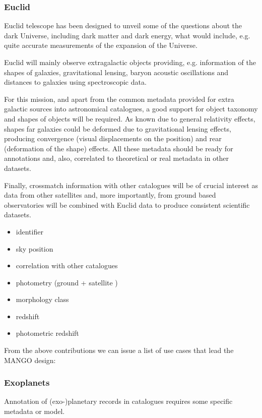 \documentclass[11pt,a4paper]{ivoa}
\begin{document}
\subsubsection{Euclid}
Euclid telescope has been designed to unveil some of the questions about the
dark Universe, including dark matter and dark energy, what would include, e.g.
quite accurate measurements of the expansion of the Universe.

Euclid will mainly observe extragalactic objects providing, e.g. information
of the shapes of galaxies, gravitational lensing,  baryon acoustic oscillations
and distances to galaxies using spectroscopic data.

For this mission, and apart from the common metadata provided for extra galactic
sources into astronomical catalogues, a good support for object taxonomy and
shapes of objects will be required. As known due to general relativity effects,
shapes far galaxies could be deformed due to gravitational lensing effects,
producing convergence (visual displacements on the position) and rear (deformation
of the shape) effects. All these metadata should be ready for annotations and,
also, correlated to theoretical or real metadata in other datasets.

Finally, crossmatch information with other catalogues will be of crucial interest
as data from other satellites and, more importantly, from ground based
observatories will be combined with Euclid data to produce consistent scientific
datasets.

\begin{itemize}[noitemsep,topsep=0pt,parsep=0pt,partopsep=0pt]
    \item identifier
    \item sky position
    \item correlation with other catalogues
    \item photometry (ground + satellite )
    \item morphology class
    \item redshift
    \item photometric redshift
\end{itemize}
From the above contributions we can issue a list of use cases that lead the MANGO design: 

\subsubsection{Exoplanets}
Annotation of (exo-)planetary records in catalogues requires some
specific metadata or model.
\end{document}
